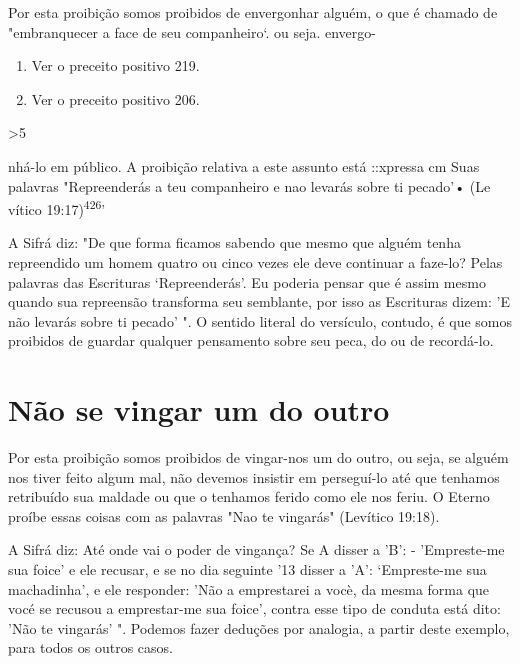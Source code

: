 \begin{itemize}
\begin{enumrate}
\begin{itemize}
\begin{itemize}
\begin{itemize}
Por esta proibição somos proibidos de envergonhar alguém, o que é
chamado de "embranquecer a face de seu companheiro`. ou seja. envergo-


\begin{enumerate}
\def\labelenumi{\arabic{enumi}.}
\setcounter{enumi}{423}
\item
 
 Ver o preceito positivo 219.
 
\item
 
 Ver o preceito positivo 206.
 
\end{enumerate}




\textgreater5

nhá-lo em público. A proibição relativa a este assunto está ::xpressa cm
Suas palavras "Repreenderás a teu companheiro e nao levarás sobre ti
pecado'• (Le vítico 19:17)\textsuperscript{426}'

A Sifrá diz: "De que forma ficamos sabendo que mesmo que alguém tenha
repreendido um homem quatro ou cinco vezes ele deve continuar a faze-lo?
Pelas palavras das Escrituras `Repreenderás'. Eu poderia pensar que é
assim mesmo quando sua repreensão transforma seu semblante, por isso as
Escritu­ras dizem: 'E não levarás sobre ti pecado' ". O sentido literal
do versículo, con­tudo, é que somos proibidos de guardar qualquer
pensamento sobre seu peca, do ou de recordá-lo.

\section{Não se vingar um do outro}

Por esta proibição somos proibidos de vingar-nos um do outro, ou seja,
se alguém nos tiver feito algum mal, não devemos insistir em perseguí-lo
até que tenhamos retribuído sua maldade ou que o tenhamos ferido como
ele nos feriu. O Eterno proíbe essas coisas com as palavras "Nao te
vingarás" (Le­vítico 19:18).

A Sifrá diz: Até onde vai o poder de vingança? Se A disser a 'B': -
'Empreste-me sua foice' e ele recusar, e se no dia seguinte '13 disser a
'A': `Empreste-me sua machadinha', e ele responder: 'Não a emprestarei a
vocè, da mesma forma que vocé se recusou a emprestar-me sua foice',
contra esse tipo de conduta está dito: 'Não te vingarás' ". Podemos
fazer deduções por analo­gia, a partir deste exemplo, para todos os
outros casos.


\end{itemize}
\end{itemize}
\end{itemize}
\end{enumrate}
\end{itemize}
